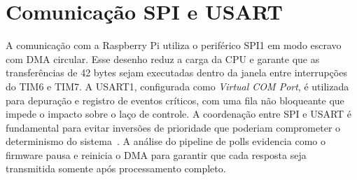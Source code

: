 \section{Comunicação SPI e USART}

A comunicação com a Raspberry Pi utiliza o periférico SPI1 em modo
escravo com DMA circular. Esse desenho reduz a carga da CPU e garante que
as transferências de 42 bytes sejam executadas dentro da janela entre
interrupções do TIM6 e TIM7. A USART1, configurada como \emph{Virtual
COM Port}, é utilizada para depuração e registro de eventos críticos,
com uma fila não bloqueante que impede o impacto sobre o laço de
controle. A coordenação entre SPI e USART é fundamental para evitar
inversões de prioridade que poderiam comprometer o determinismo do
sistema~\cite{um2153}. A análise do pipeline de polls evidencia como o
firmware pausa e reinicia o DMA para garantir que cada resposta seja
transmitida somente após processamento completo.